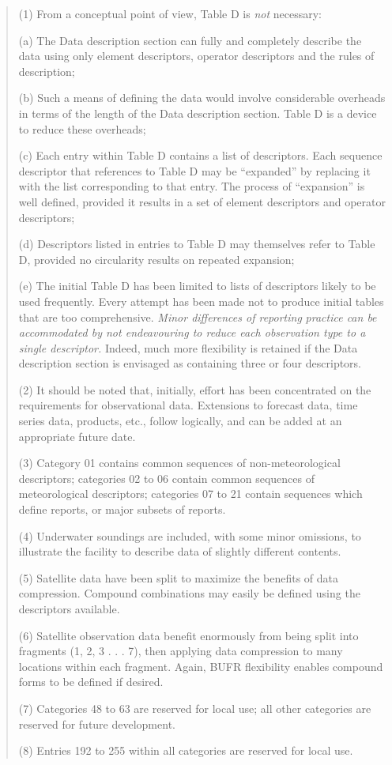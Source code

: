 \begin{quote}
(1) From a conceptual point of view, Table D is \emph{not} necessary:

(a) The Data description section can fully and completely describe the data using only element descriptors, operator descriptors and the rules of description;

(b) Such a means of defining the data would involve considerable overheads in terms of the length of the Data description section. Table D is a device to reduce these overheads;

(c) Each entry within Table D contains a list of descriptors. Each sequence descriptor that references to Table D may be ``expanded'' by replacing it with the list corresponding to that entry. The process of ``expansion'' is well defined, provided it results in a set of element descriptors and operator descriptors;

(d) Descriptors listed in entries to Table D may themselves refer to Table D, provided no circularity results on repeated expansion;

(e) The initial Table D has been limited to lists of descriptors likely to be used frequently. Every attempt has been made not to produce initial tables that are too comprehensive. \emph{Minor differences of reporting} \emph{practice can be accommodated by not endeavouring to reduce each observation type to a single descriptor.} Indeed, much more flexibility is retained if the Data description section is envisaged as containing three or four descriptors.

(2) It should be noted that, initially, effort has been concentrated on the requirements for observational data. Extensions to forecast data, time series data, products, etc., follow logically, and can be added at an appropriate future date.

(3) Category 01 contains common sequences of non-meteorological descriptors; categories 02 to 06 contain common sequences of meteorological descriptors; categories 07 to 21 contain sequences which define reports, or major subsets of reports.

(4) Underwater soundings are included, with some minor omissions, to illustrate the facility to describe data of slightly different contents.

(5) Satellite data have been split to maximize the benefits of data compression. Compound combinations may easily be defined using the descriptors available.

(6) Satellite observation data benefit enormously from being split into fragments (1, 2, 3 . . . 7), then applying data compression to many locations within each fragment. Again, BUFR flexibility enables compound forms to be defined if desired.

(7) Categories 48 to 63 are reserved for local use; all other categories are reserved for future development.

(8) Entries 192 to 255 within all categories are reserved for local use.
\end{quote}

